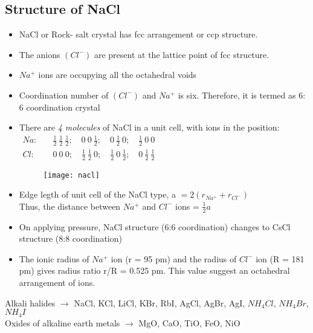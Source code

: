 \subsection{Structure of NaCl}
\begin{itemize}
	\item NaCl or Rock- salt crystal has fcc arrangement or ccp structure.
	\item The anions $(Cl^{-})$ are present at the lattice point of fcc structure.
	\item $Na^{+}$ ions are occupying all the octahedral voids
	\item Coordination number of $(Cl^{-})$ and $Na^{+}$ is six. Therefore, it is termed as 6: 6 coordination crystal
	\item There are\textit{ 4 molecules} of NaCl in a unit cell, with ions in the position:\\
	$\begin{aligned}
	Na:\quad &\frac{1}{2}\  \frac{1}{2}\  \frac{1}{2};\quad 0\  0\  \frac{1}{2};\quad 0\  \frac{1}{2}\  0;\quad \frac{1}{2}\  0\  0\\
	Cl:\quad &0\  0\  0;\quad \frac{1}{2}\  \frac{1}{2} \ 0;\quad \frac{1}{2}\  0\  \frac{1}{2};\quad 0\  \frac{1}{2}\  \frac{1}{2}
	\end{aligned}$\\
	\begin{figure}[h]
		\texttt{[image: nacl]}
	\end{figure}
	\item Edge legth of unit cell of the NaCl type, a $=2(r_{Na^{+}}+r_{Cl^{-}})$\\
	Thus, the distance between  $Na^{+}$ and $Cl^{-}$ ions = $\frac{1}{2}a$
	\item On applying pressure, NaCl structure (6:6 coordination) changes to CsCl structure (8:8 coordination)
	\item The ionic radius of $Na^{+}$ ion (r = 95 pm) and the radius of $Cl^{-}$ ion (R = 181 pm) gives radius ratio r/R = 0.525 pm. This value suggest an octahedral arrangement of ions.
\end{itemize}
\begin{example}
	Alkali halides $\longrightarrow$ NaCl, KCl, LiCl, KBr, RbI, AgCl, AgBr, AgI, $NH_{4}Cl$, $NH_{4}Br$, $NH_{4}I$\\
	Oxides of alkaline earth metals $\longrightarrow$ MgO, CaO, TiO, FeO, NiO
\end{example}

